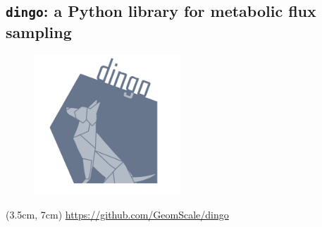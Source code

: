 \documentclass{beamer}
\begin{document}

   \begin{darkframes}
      \section{
         \texttt{dingo}: a Python library for metabolic flux sampling
      }   
   \end{darkframes}

   \begin{frame}
      
      \begin{figure}
         \includegraphics[width=55mm]{../met_nets/resources/dingo5_transparent.png}
      \end{figure}

      \begin{textblock*}{12cm}(3.5cm, 7cm)
         \href{https://github.com/GeomScale/dingo}{https://github.com/GeomScale/dingo}
      \end{textblock*}

   \end{frame}



      
   
\end{document}
